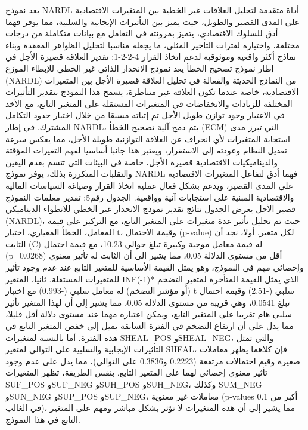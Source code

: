 \documentclass[12pt,a4paper]{report}
\begin{document}
يعد نموذج NARDL أداة متقدمة لتحليل العلاقات غير الخطية بين المتغيرات الاقتصادية على المدى القصير والطويل، حيث يميز بين التأثيرات الإيجابية والسلبية، مما يوفر فهما أدق للسلوك الاقتصادي، يتميز بمرونته في التعامل مع بيانات متكاملة من درجات مختلفة، واختياره لفترات التأخير المثلى، ما يجعله مناسبا لتحليل الظواهر المعقدة وبناء نماذج أكثر واقعية وموثوقية لدعم اتخاذ القرار
4-2-2-1: تقدير العلاقة قصيرة الأجل في إطار نموذج تصحيح الخطأ 
يعد نموذج الانحدار الذاتي غير الخطي للإبطاء الموزع (NARDL) من النماذج الحديثة والفعالة في تحليل العلاقة قصيرة الأجل بين المتغيرات الاقتصادية، خاصة عندما تكون العلاقة غير متناظرة، يسمح هذا النموذج بتقدير التأثيرات المختلفة للزيادات والانخفاضات في المتغيرات المستقلة على المتغير التابع، مع الأخذ في الاعتبار وجود توازن طويل الأجل تم إثباته مسبقا من خلال اختبار حدود التكامل المشترك.
في إطار NARDL، يتم دمج آلية تصحيح الخطأ (ECM) التي تبرز مدى استجابة المتغيرات لأي انحراف عن العلاقة التوازنية طويلة الأجل، مما يعكس سرعة تعديل النظام وعودته إلى الاستقرار، ويعتبر هذا جانبا أساسيا لفهم التغيرات المؤقتة والديناميكيات الاقتصادية قصيرة الأجل، خاصة في البيئات التي تتسم بعدم اليقين والتقلبات المتكررة بذلك، يوفر نموذج NARDL فهما أدق لتفاعل المتغيرات الاقتصادية على المدى القصير، ويدعم بشكل فعال عملية اتخاذ القرار وصياغة السياسات المالية والاقتصادية المبنية على استجابات آنية وواقعية.
الجدول رقم5: تقدير معلمات النموذج قصير الأجل
يعرض الجدول نتائج تقدير نموذج الانحدار غير الخطي للانطواء الديناميكي (NARDL)، حيث تم تحليل تأثير عدة متغيرات على المتغير التابع، مع التركيز على قيمة المعامل، الخطأ المعياري، اختبار t، وقيمة الاحتمال (p-value) لكل متغير.
أولا، نجد أن الثابت (C) له قيمة معامل موجبة وكبيرة تبلغ حوالي 10.23، مع قيمة احتمال (p=0.0268) أقل من مستوى الدلالة 0.05، مما يشير إلى أن الثابت له تأثير معنوي وإحصائي مهم في النموذج، وهو يمثل القيمة الأساسية للمتغير التابع عند عدم وجود تأثير للمتغيرات المستقلة.
ثانيا، المتغير INF(-1)* الذي يمثل القيمة المتأخرة لمتغير التضخم (أو مؤشر التضخم) له معامل سلبي (-0.993) مع اختبار t سلبي (-2.51) وقيمة احتمال تبلغ 0.0541، وهي قريبة من مستوى الدلالة 0.05، مما يشير إلى أن لهذا المتغير تأثير سلبي هام تقريبا على المتغير التابع، ويمكن اعتباره مهما عند مستوى دلالة أقل قليلا، مما يدل على أن ارتفاع التضخم في الفترة السابقة يميل إلى خفض المتغير التابع في هذه الفترة.
أما بالنسبة لمتغيرات SHEAL_POS وSHEAL_NEG، والتي تمثل التأثيرات الإيجابية والسلبية على التوالي لمتغير SHEAL، فإن كلاهما يظهر معاملات صغيرة وقيم احتمالات مرتفعة (0.2223 و0.3836 على التوالي)، مما يدل على عدم وجود تأثير معنوي إحصائي لهما على المتغير التابع.
       بنفس الطريقة، تظهر المتغيرات SUF_POS وSUF_NEG وSUH_POS وSUH_NEG، وكذلك SUM_NEG وSUN_NEG وSUP_POS وSUP_NEG، معاملات غير معنوية (p-values أكبر من 0.1 في الغالب)، مما يشير إلى أن هذه المتغيرات لا تؤثر بشكل مباشر ومهم على المتغير التابع في هذا النموذج.
\end{document}
